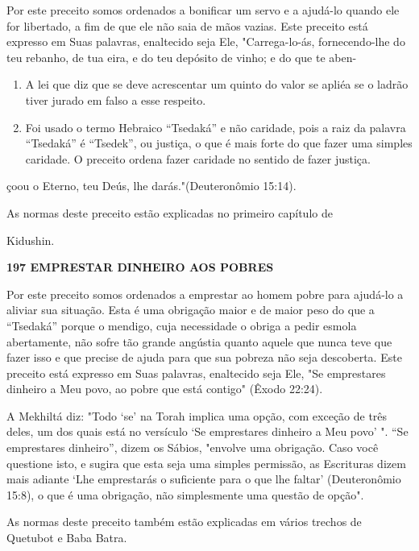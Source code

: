Por este preceito somos ordenados a bonificar um servo e a ajudá-lo
quando ele for libertado, a fim de que ele não saia de mãos vazias. Este
preceito está expresso em Suas palavras, enaltecido seja Ele,
"Carrega-lo-ás, fornecendo-lhe do teu rebanho, de tua eira, e do teu
depósito de vinho; e do que te aben-


\begin{enumerate}
\def\labelenumi{\arabic{enumi}.}
\setcounter{enumi}{198}
\item
 
 A lei que diz que se deve acrescentar um quinto do valor se apliéa se
 o ladrão tiver jurado em falso a esse respeito.
 
\item
 
 Foi usado o termo Hebraico ``Tsedaká'' e não caridade, pois a raiz da
 palavra ``Tsedaká'' é ``Tsedek'', ou justiça, o que é mais forte do que
 fazer uma simples caridade. O preceito ordena fazer caridade no
 sentido de fazer justiça.
 
\end{enumerate}

çoou o Eterno, teu Deús, lhe darás."(Deuteronômio 15:14).


As normas deste preceito estão explicadas no primeiro capítulo de


Kidushin.


\textbf{197 EMPRESTAR DINHEIRO AOS POBRES}


Por este preceito somos ordenados a emprestar ao homem pobre para
ajudá-lo a aliviar sua situação. Esta é uma obrigação maior e de maior
peso do que a ``Tsedaká'' porque o mendigo, cuja necessidade o obriga a
pedir es­mola abertamente, não sofre tão grande angústia quanto aquele
que nunca teve que fazer isso e que precise de ajuda para que sua
pobreza não seja descoberta. Este preceito está expresso em Suas
palavras, enaltecido seja Ele, "Se empresta­res dinheiro a Meu povo, ao
pobre que está contigo" (Êxodo 22:24).

A Mekhiltá diz: "Todo `se' na Torah implica uma opção, com exce­ção de
três deles, um dos quais está no versículo `Se emprestares dinheiro a
Meu povo' ". ``Se emprestares dinheiro'', dizem os Sábios, "envolve uma
obri­gação. Caso você questione isto, e sugira que esta seja uma simples
permissão, as Escrituras dizem mais adiante `Lhe emprestarás o
suficiente para o que lhe faltar' (Deuteronômio 15:8), o que é uma
obrigação, não simplesmente uma ques­tão de opção".

As normas deste preceito também estão explicadas em vários trechos de
Quetubot e Baba Batra.


